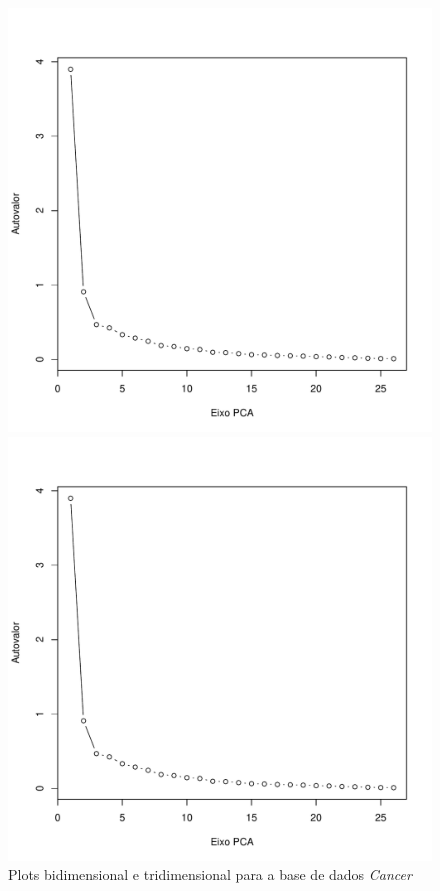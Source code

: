 \documentclass[a4paper]{article}
\begin{document}
\begin{figure}[H]
	\centering
	\begin{minipage}{.5\textwidth}
		\centering
		\includegraphics[page=2,width=\textwidth]{../cancer.pdf}
	\end{minipage}%
	\begin{minipage}{.5\textwidth}
		\centering
		\includegraphics[page=3,width=\textwidth]{../cancer.pdf}
	\end{minipage}
	\caption{Plots bidimensional e tridimensional para a base de dados \textit{Cancer}}
	\label{fig:cancerPlots}
\end{figure}
\end{document}
